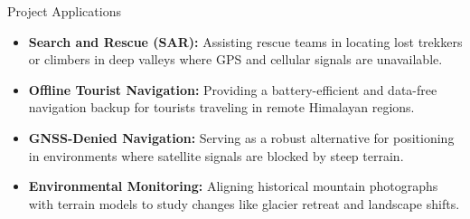 
\begin{frame}{Project Applications}
    \begin{itemize}
        \item \textbf{Search and Rescue (SAR):} Assisting rescue teams in locating lost trekkers or climbers in deep valleys where GPS and cellular signals are unavailable.
        
        \item \textbf{Offline Tourist Navigation:} Providing a battery-efficient and data-free navigation backup for tourists traveling in remote Himalayan regions.
        
        \item \textbf{GNSS-Denied Navigation:} Serving as a robust alternative for positioning in environments where satellite signals are blocked by steep terrain.
        
        \item \textbf{Environmental Monitoring:} Aligning historical mountain photographs with terrain models to study changes like glacier retreat and landscape shifts.
    \end{itemize}
\end{frame}